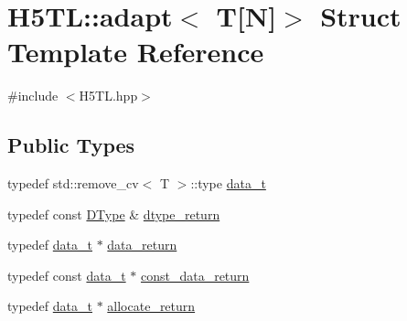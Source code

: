 \hypertarget{struct_h5_t_l_1_1adapt_3_01_t[_n]_4}{\section{H5\-T\-L\-:\-:adapt$<$ T\mbox{[}N\mbox{]}$>$ Struct Template Reference}
\label{struct_h5_t_l_1_1adapt_3_01_t[_n]_4}
}


{\ttfamily \#include $<$H5\-T\-L.\-hpp$>$}

\subsection*{Public Types}
\begin{DoxyCompactItemize}
\item 
typedef std\-::remove\-\_\-cv$<$ T $>$\-::type \hyperlink{struct_h5_t_l_1_1adapt_3_01_t[_n]_4_af9933a1521aecd615759226aab22fc60}{data\-\_\-t}
\item 
typedef const \hyperlink{class_h5_t_l_1_1_d_type}{D\-Type} \& \hyperlink{struct_h5_t_l_1_1adapt_3_01_t[_n]_4_a796cb13cf8219e0bef087b366e33be18}{dtype\-\_\-return}
\item 
typedef \hyperlink{struct_h5_t_l_1_1adapt_3_01_t[_n]_4_af9933a1521aecd615759226aab22fc60}{data\-\_\-t} $\ast$ \hyperlink{struct_h5_t_l_1_1adapt_3_01_t[_n]_4_a255473fbedaa64738ad99c1b2b4e9f33}{data\-\_\-return}
\item 
typedef const \hyperlink{struct_h5_t_l_1_1adapt_3_01_t[_n]_4_af9933a1521aecd615759226aab22fc60}{data\-\_\-t} $\ast$ \hyperlink{struct_h5_t_l_1_1adapt_3_01_t[_n]_4_aa26ab555a2c6ae40181e9212b292e3df}{const\-\_\-data\-\_\-return}
\item 
typedef \hyperlink{struct_h5_t_l_1_1adapt_3_01_t[_n]_4_af9933a1521aecd615759226aab22fc60}{data\-\_\-t} $\ast$ \hyperlink{struct_h5_t_l_1_1adapt_3_01_t[_n]_4_a0b70e9265935053f7cd15dd9ae47b5e9}{allocate\-\_\-return}
\end{DoxyCompactItemize}
